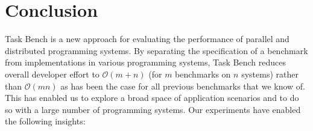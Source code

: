 \section{Conclusion}
\label{sec:conclusion}

Task Bench is a new approach for evaluating the performance of
parallel and distributed programming systems. By separating the
specification of a benchmark from implementations in various
programming systems, Task Bench reduces overall developer effort to
$\mathcal{O}(m + n)$ (for $m$ benchmarks on $n$ systems) rather than
$\mathcal{O}(mn)$ as has been the case for all previous
benchmarks that we know of. This has enabled us to explore a broad space of
application scenarios and to do so with a large number of programming
systems. Our experiments have enabled the following
insights:


